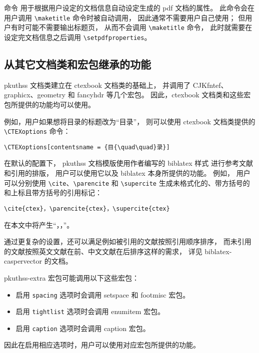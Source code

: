 		\texttt{\bfseries\string\setpdfproperties} 命令%
		用于根据用户设定的文档信息自动设定生成的 pdf 文档的属性。
		此命令会在用户调用 \verb|\maketitle| 命令时被自动调用，
		因此通常不需要用户自己使用；
		但用户有时可能不需要输出标题页，
		从而不会调用 \verb|\maketitle| 命令，
		此时就需要在设定完文档信息之后调用 \verb|\setpdfproperties|。

		\subsection{从其它文档类和宏包继承的功能}\label{ssec:thirdparty}

		pkuthss 文档类建立在 ctexbook\supercite{ctex} 文档类的基础上，
		并调用了 CJKfntef、%
		graphicx\supercite{graphicx}、geometry\supercite{geometry} 和 %
		fancyhdr\supercite{fancyhdr} 等几个宏包。
		因此，ctexbook 文档类和这些宏包所提供的功能均可以使用。

		例如，用户如果想将目录的标题改为“目{\quad\quad}录”，
		则可以使用 ctexbook 文档类提供的 \verb|\CTEXoptions| 命令：
\begin{Verbatim}[frame = single]
\CTEXoptions[contentsname = {目{\quad\quad}录}]
\end{Verbatim}

		在默认的配置下，%
		pkuthss 文档模版使用作者编写的 %
		biblatex\supercite{biblatex} 样式\supercite{biblatex-caspervector}%
		进行参考文献和引用的排版，
		用户可以使用它以及 biblatex 本身所提供的功能。
		例如，
		用户可以分别使用 \verb|\cite|、\verb|\parencite| 和 \verb|\supercite| %
		生成未格式化的、带方括号的和上标且带方括号的引用标记：
\begin{Verbatim}[frame = single]
\cite{ctex}，\parencite{ctex}，\supercite{ctex}
\end{Verbatim}
		在本文中将产生“\cite{ctex}，\parencite{ctex}，\supercite{ctex}”。

		通过更复杂的设置，还可以满足例如被引用的文献按照引用顺序排序，
		而未引用的文献按照英文文献在前、中文文献在后排序这样的需求，
		详见 biblatex-caspervector 的文档\supercite{biblatex-caspervector}。

		pkuthss-extra 宏包可能调用以下这些宏包：
		\begin{itemize}
			\item 启用 \verb|spacing| 选项时会调用 %
				setspace 和 footmisc\supercite{footmisc} 宏包。
			\item 启用 \verb|tightlist| 选项时会调用 %
				enumitem\supercite{enumitem} 宏包。
			\item 启用 \verb|caption| 选项时会调用 %
				caption\supercite{caption} 宏包。
		\end{itemize}
		因此在启用相应选项时，用户可以使用对应宏包所提供的功能。

